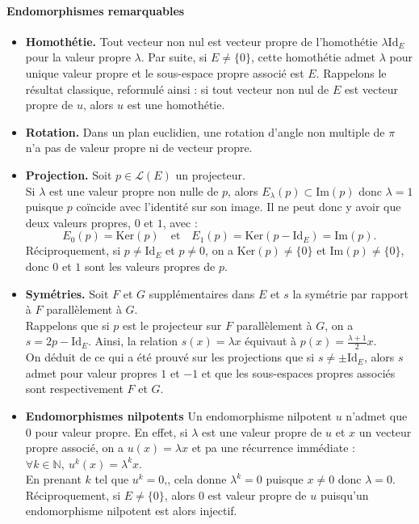 \documentclass[french]{article}
\newcommand{\N}{\mathbb{N}}
\renewcommand{\ker}{\text{Ker}}
\newcommand{\Id}{\text{Id}}
\theoremstyle{plain}
\theoremstyle{definition}
\theoremstyle{remark}
\begin{document}
	\paragraph{Endomorphismes remarquables}
	\begin{itemize}
		\item \textbf{Homothétie.} Tout vecteur non nul est vecteur propre de l'homothétie $\lambda\Id_E$ pour la valeur propre $\lambda$. Par suite, si $E\ne\{0\}$, cette homothétie admet $\lambda$ pour unique valeur propre et le sous-espace propre associé est $E$. Rappelons le résultat classique, reformulé ainsi : si tout vecteur non nul de $E$ est vecteur propre de $u$, alors $u$ est une homothétie.
		\item \textbf{Rotation.} Dans un plan euclidien, une rotation d'angle non multiple de $\pi$ n'a pas de valeur propre ni de vecteur propre.
		\item \textbf{Projection.} Soit $p\in\mathcal{L}(E)$ un projecteur. \\
		Si $\lambda$ est une valeur propre non nulle de $p$, alors $E_\lambda(p)\subset\text{Im}(p)$ donc $\lambda=1$ puisque $p$ coïncide avec l'identité sur son image. Il ne peut donc y avoir que deux valeurs propres, $0$ et $1$, avec : $$E_0(p)=\ker(p)\quad\text{et}\quad E_1(p)=\ker(p-\Id_E)=\text{Im}(p).$$
		Réciproquement, si $p\ne\Id_E$ et $p\ne 0$, on a $\ker(p)\ne\{0\}$ et $\text{Im}(p)\ne\{0\}$, donc $0$ et $1$ sont les valeurs propres de $p$.
		\item \textbf{Symétries.} Soit $F$ et $G$ supplémentaires dans $E$ et $s$ la symétrie par rapport à $F$ parallèlement à $G$. \\
		Rappelons que si $p$ est le projecteur sur $F$ parallèlement à $G$, on a $s=2p-\Id_E$. Ainsi, la relation $s(x)=\lambda x$ équivaut à $p(x)=\displaystyle\frac{\lambda+1}{2}x$. \\
		On déduit de ce qui a été prouvé sur les projections que si $s\ne\pm\Id_E$, alors $s$ admet pour valeur propres $1$ et $-1$ et que les sous-espaces propres associés sont respectivement $F$ et $G$.
		\item \textbf{Endomorphismes nilpotents} Un endomorphisme nilpotent $u$ n'admet que $0$ pour valeur propre. En effet, si $\lambda$ est une valeur propre de $u$ et $x$ un vecteur propre associé, on a $u(x)=\lambda x$ et pa une récurrence immédiate : $\forall k\in\N,\ u^k(x)=\lambda^kx$. \\
		En prenant $k$ tel que $u^k=0$,, cela donne $\lambda^k=0$ puisque $x\ne 0$ donc $\lambda=0$.\\
		Réciproquement, si $E\ne\{0\}$, alors $0$ est valeur propre de $u$ puisqu'un endomorphisme nilpotent est alors injectif. %
	\end{itemize}
	
\end{document}
